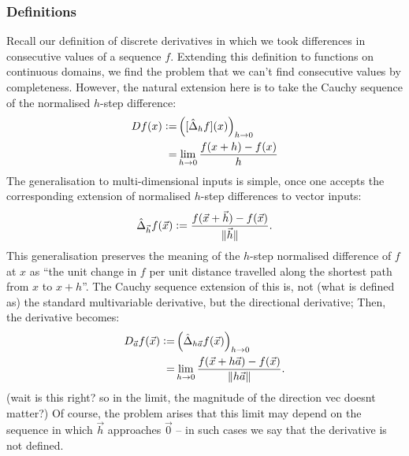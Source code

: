 \documentclass{article}
\newcommand{\vc}{\vcentcolon}
\theoremstyle{definition}
\begin{document}
\subsubsection{Definitions}
Recall our definition of discrete derivatives in which we took differences in consecutive values of a sequence $f$. Extending this definition to functions on continuous domains, we find the problem that we can't find consecutive values by completeness. However, the natural extension here is to take the Cauchy sequence of the normalised $h$-step difference:
\begin{align*}
	Df(x)\vc=&\left([\hat{\Delta}_hf](x)\right)_{h\rightarrow0}\\
	=&\lim\limits_{h\rightarrow0}\frac{f(x+h)-f(x)}{h}
\end{align*}
The generalisation to multi-dimensional inputs is simple, once one accepts the corresponding extension of normalised $h$-step differences to vector inputs:
\begin{align*}
	\hat{\Delta}_{\vec h}f(\vec x)\vc=\frac{f(\vec x+\vec h)-f(\vec x)}{\lVert\vec h\rVert}.
\end{align*}
This generalisation preserves the meaning of the $h$-step normalised difference of $f$ at $x$ as ``the unit change in $f$ per unit distance travelled along the shortest path from $x$ to $x+h$''. 
The Cauchy sequence extension of this is, not (what is defined as) the standard multivariable derivative, but the directional derivative;
Then, the derivative becomes:
\begin{align*}
	D_{\vec a}f(\vec x)\vc=&\left(\hat{\Delta}_{h\vec a}f(\vec x)\right)_{h\rightarrow0}\\
	=&\lim\limits_{h\rightarrow0}\frac{f(\vec x+h\vec a)-f(\vec x)}{\lVert h\vec a\rVert}.
\end{align*}
(wait is this right? so in the limit, the magnitude of the direction vec doesnt matter?)
Of course, the problem arises that this limit may depend on the sequence in which $\vec h$ approaches $\vec0$ -- in such cases we say that the derivative is not defined.
\end{document}
